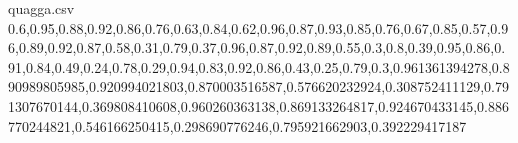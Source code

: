 \documentclass{llncs}
\begin{document}
\begin{filecontents*}{quagga.csv}
	0.6,0.95,0.88,0.92,0.86,0.76,0.63,0.84,0.62,0.96,0.87,0.93,0.85,0.76,0.67,0.85,0.57,0.96,0.89,0.92,0.87,0.58,0.31,0.79,0.37,0.96,0.87,0.92,0.89,0.55,0.3,0.8,0.39,0.95,0.86,0.91,0.84,0.49,0.24,0.78,0.29,0.94,0.83,0.92,0.86,0.43,0.25,0.79,0.3,0.961361394278,0.890989805985,0.920994021803,0.870003516587,0.576620232924,0.308752411129,0.791307670144,0.369808410608,0.960260363138,0.869133264817,0.924670433145,0.886770244821,0.546166250415,0.298690776246,0.795921662903,0.392229417187
\end{filecontents*}
\end{document}
